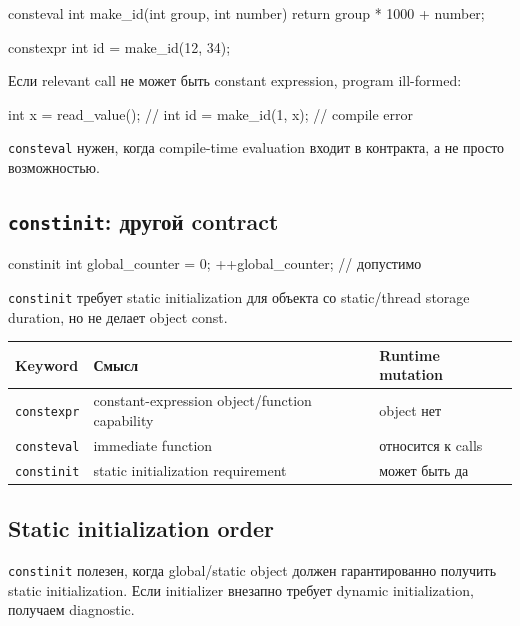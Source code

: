 \begin{cppcode}
consteval int make_id(int group, int number) {
    return group * 1000 + number;
}

constexpr int id = make_id(12, 34);
\end{cppcode}

Если relevant call не может быть constant expression, program ill-formed:

\begin{cppcode}
int x = read_value();
// int id = make_id(1, x); // compile error
\end{cppcode}

\texttt{consteval} нужен, когда compile-time evaluation входит в
контракта, а не просто возможностью.

\subsection{\texttt{constinit}: другой contract}

\begin{cppcode}
constinit int global_counter = 0;
++global_counter; // допустимо
\end{cppcode}

\texttt{constinit} требует static initialization для объекта со static/thread
storage duration, но не делает object const.

\begin{center}
\begin{tabularx}{\textwidth}{L{0.20\textwidth}YY}
\toprule
Keyword & Смысл & Runtime mutation \\
\midrule
\texttt{constexpr} & constant-expression object/function capability & object нет \\
\texttt{consteval} & immediate function & относится к calls \\
\texttt{constinit} & static initialization requirement & может быть да \\
\bottomrule
\end{tabularx}
\end{center}

\subsection{Static initialization order}

\texttt{constinit} полезен, когда global/static object должен гарантированно
получить static initialization. Если initializer внезапно требует dynamic
initialization, получаем diagnostic.

